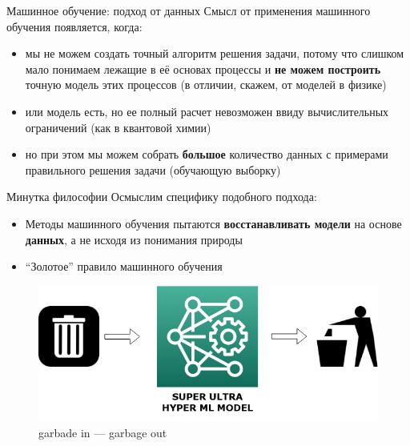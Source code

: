 \documentclass[aspectratio=169]{beamer}
\begin{document}
\begin{frame}{Машинное обучение: подход от данных}
    Смысл от применения машинного обучения появляется, когда:
    \begin{itemize}
        \item мы не можем создать точный алгоритм решения задачи, потому что
        слишком мало понимаем лежащие в её основах процессы и
        \textbf{не можем построить} точную модель этих процессов (в отличии,
        скажем, от моделей в физике)
        \pause{}
        \item или модель есть, но ее полный расчет невозможен ввиду вычислительных
        ограничений (как в квантовой химии) 
        \pause{}
        \item но при этом мы можем собрать \textbf{большое} количество данных с примерами
        правильного решения задачи (обучающую выборку)
    \end{itemize}
\end{frame}

\begin{frame}{Минутка философии}
    Осмыслим специфику подобного подхода:
    \begin{itemize}
        \item Методы машинного обучения пытаются \textbf{восстанавливать модели} на
        основе \textbf{данных}, а не исходя из понимания природы
        \pause{}
        \item ``Золотое'' правило машинного обучения
    \end{itemize}
    \begin{figure}
        \includegraphics[width=.49\linewidth]{graphs/fig17.jpg}
        \caption*{garbade in --- garbage out}
    \end{figure}
\end{frame}
\end{document}
